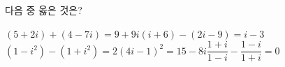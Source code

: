 다음 중 옳은 것은?
\begin{choicesv}{$(5+2i)+(4-7i)=9+9i$}{$(i+6)-(2i-9)=i-3$}{$(1-i^2)-(1+i^2)=2$}{$(4i-1)^2=15-8i$}{$\dfrac{1+i}{1-i}-\dfrac{1-i}{1+i}=0$}\end{choicesv}
